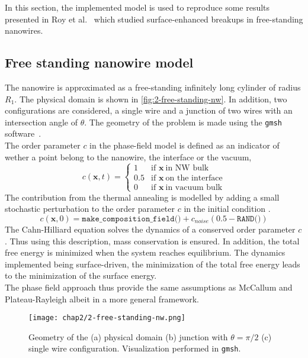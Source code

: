 \label{chap:2_4-nanowire}
In this section, the implemented model is used to reproduce some results presented in Roy et al.\ \cite{RoyVarmaGururajan2021} which studied surface-enhanced breakups in free-standing nanowires.
\subsection{Free standing nanowire model}
    The nanowire is approximated as a free-standing infinitely long cylinder of radius $R_1$. The physical domain is shown in \autoref{fig:2-free-standing-nw}. In addition, two configurations are considered, a single wire and a junction of two wires with an intersection angle of $\theta$. The geometry of the problem is made using the \texttt{gmsh} software\ \cite{geuzaine}.\\
    The order parameter $c$ in the phase-field model is defined as an indicator of wether a point belong to the nanowire, the interface or the vacuum,
    \begin{equation}
        c(\mathbf{x}, t) = \begin{cases}
            1 & \text{if } \mathbf{x}\ \text{in NW bulk} \\
            0.5 & \text{if } \mathbf{x}\ \text{on the interface} \\
            0 & \text{if } \mathbf{x}\ \text{in vacuum bulk}
        \end{cases}
    \end{equation}
    The contribution from the thermal annealing is modelled by adding a small stochastic perturbation to the order parameter $c$ in the initial condition \cite{}.
    \begin{equation}
        c(\mathbf{x}, 0) = \texttt{make\_composition\_field()} + c_{noise}(0.5-\texttt{RAND()})
    \end{equation}
    The Cahn-Hilliard equation solves the dynamics of a conserved order parameter $c$. Thus using this description, mass conservation is ensured. In addition, the total free energy is minimized when the system reaches equilibrium. The dynamics implemented being surface-driven, the minimization of the total free energy leads to the minimization of the surface energy.\\
    The phase field approach thus provide the same assumptions as McCallum and Plateau-Rayleigh albeit in a more general framework.
    \begin{figure}[H]
        \centering
        \texttt{[image: chap2/2-free-standing-nw.png]}
        \caption{Geometry of the (a) physical domain (b) junction with $\theta = \pi/2$ (c) single wire configuration. Visualization performed in \texttt{gmsh}.}
        \label{fig:2-free-standing-nw}
    \end{figure}
